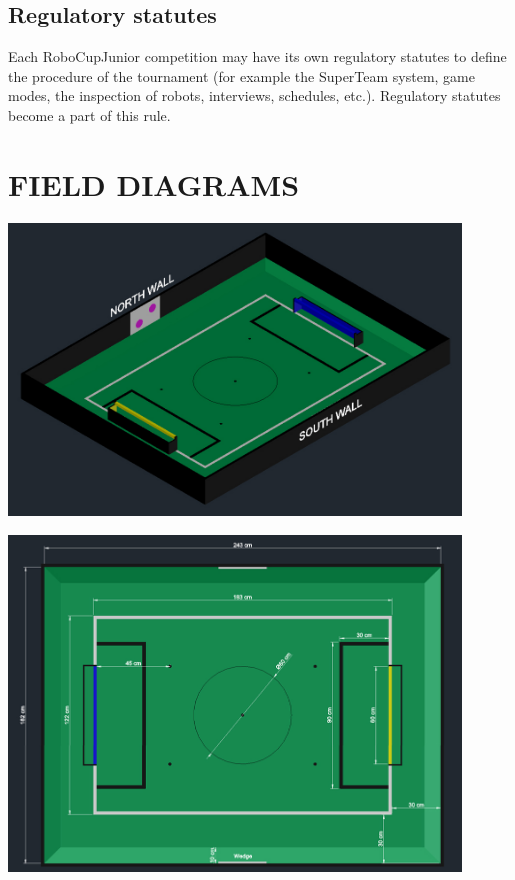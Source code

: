 \documentclass{article}
\begin{document}
\subsection{Regulatory statutes \label{ref-051}}

Each RoboCupJunior competition may have its own regulatory statutes to define
the procedure of the tournament (for example the SuperTeam system, game modes,
the inspection of robots, interviews, schedules, etc.). Regulatory statutes
become a part of this rule.

\section*{FIELD DIAGRAMS}

\begin{center}

\includegraphics[width=0.9\textwidth]{media/image5_new.jpeg}

\includegraphics[width=0.9\textwidth]{media/image6_new.jpeg}


\end{center}
\end{document}
